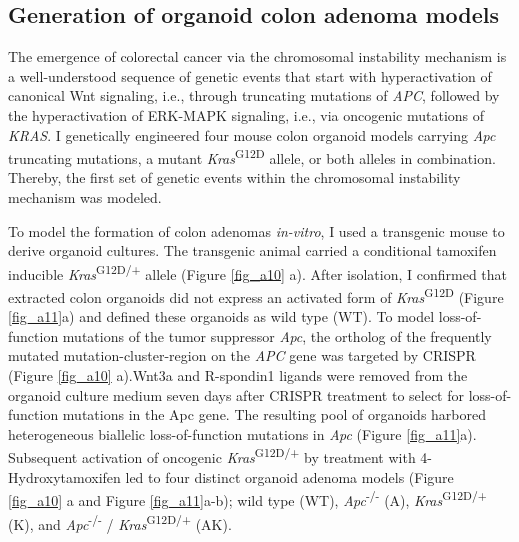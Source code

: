 \begin{flushleft}
\clearpage
\subsection{Generation of organoid colon adenoma models}

The emergence of colorectal cancer via the chromosomal instability mechanism is a well-understood sequence of genetic events that start with hyperactivation of canonical Wnt signaling, i.e., through truncating mutations of \textit{APC}, followed by the hyperactivation of ERK-MAPK signaling, i.e., via oncogenic mutations of \textit{KRAS}. I genetically engineered four mouse colon organoid models carrying \textit{Apc} truncating mutations, a mutant \textit{Kras}\textsuperscript{G12D} allele, or both alleles in combination. Thereby, the first set of genetic events within the chromosomal instability mechanism was modeled. 
\bigbreak

To model the formation of colon adenomas \textit{in-vitro}, I used a transgenic mouse to derive organoid cultures. The transgenic animal carried a conditional tamoxifen inducible \textit{Kras}\textsuperscript{G12D/+} allele \parencite{jacksonAnalysisLungTumor2001} (Figure \ref{fig_a10} a). After isolation, I confirmed that extracted colon organoids did not express an activated form of \textit{Kras}\textsuperscript{G12D} (Figure \ref{fig_a11}a) and defined these organoids as wild type (WT). To model loss-of-function mutations of the tumor suppressor \textit{Apc}, the ortholog of the frequently mutated mutation-cluster-region on the \textit{APC} gene was targeted by CRISPR (Figure \ref{fig_a10} a).Wnt3a and R-spondin1 ligands were removed from the organoid culture medium seven days after CRISPR treatment to select for loss-of-function mutations in the Apc gene. The resulting pool of organoids harbored heterogeneous biallelic loss-of-function mutations in \textit{Apc} (Figure \ref{fig_a11}a). Subsequent activation of oncogenic \textit{Kras}\textsuperscript{G12D/+} by treatment with 4-Hydroxytamoxifen led to four distinct organoid adenoma models (Figure \ref{fig_a10} a and Figure \ref{fig_a11}a-b); wild type (WT), \textit{Apc}\textsuperscript{-/-}
  (A), \textit{Kras}\textsuperscript{G12D/+} (K), and \textit{Apc}\textsuperscript{-/-} / \textit{Kras}\textsuperscript{G12D/+} (AK).



\end{flushleft}
